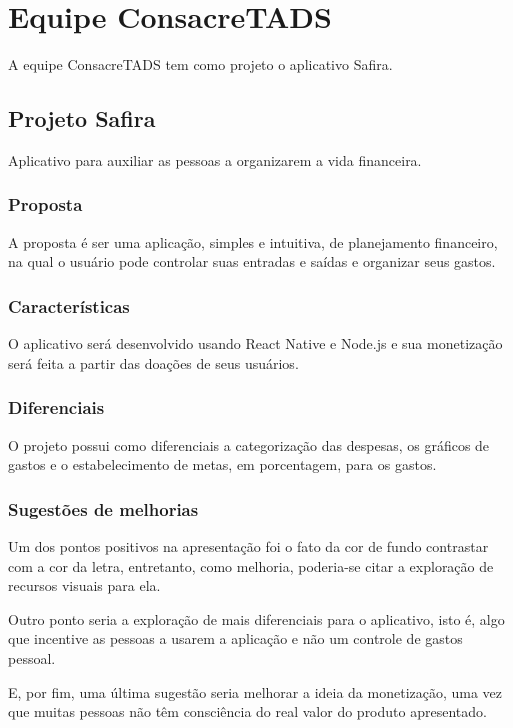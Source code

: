 \chapter[Equipe ConsacreTADS]{Equipe ConsacreTADS}
A equipe ConsacreTADS tem como projeto o aplicativo Safira.

\section{Projeto Safira}
Aplicativo para auxiliar as pessoas a organizarem a vida financeira.

\subsection{Proposta}
A proposta é ser uma aplicação, simples e intuitiva, de planejamento financeiro, na qual o usuário pode controlar suas entradas e saídas e organizar seus gastos. 

\subsection{Características}
O aplicativo será desenvolvido usando React Native e Node.js e sua monetização será feita a partir das doações de seus usuários.

\subsection{Diferenciais}
O projeto possui como diferenciais a categorização das despesas, os gráficos de gastos e o estabelecimento de metas, em porcentagem, para os gastos. 

\subsection{Sugestões de melhorias}
Um dos pontos positivos na apresentação foi o fato da cor de fundo contrastar com a cor da letra, entretanto, como melhoria, poderia-se citar a exploração de recursos visuais para ela.

Outro ponto seria a exploração de mais diferenciais para o aplicativo, isto é, algo que incentive as pessoas a usarem a aplicação e não um controle de gastos pessoal.

E, por fim, uma última sugestão seria melhorar a ideia da monetização, uma vez que muitas pessoas não têm consciência do real valor do produto apresentado.